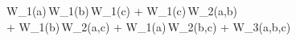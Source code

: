W_{1}(a)\,W_{1}(b)\,W_{1}(c) + W_{1}(c)\,W_{2}(a,b) \\ \qquad + W_{1}(b)\,W_{2}(a,c) + W_{1}(a)\,W_{2}(b,c) + W_{3}(a,b,c)
